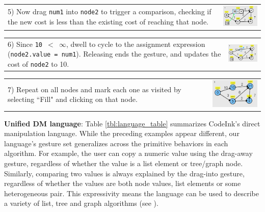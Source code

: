 \noindent \begin{tabular}{m{4.2cm} m{3.8cm}}
5) Now drag \texttt{num1} into \texttt{node2}
to trigger a comparison, checking if the new cost is less than
the existing cost of reaching that node.
& \includegraphics[width=3.8cm]{img/examples/dijkstra-5.png}
\end{tabular}

\noindent \begin{tabular}{m{4.2cm} m{3.8cm}}
6) Since \texttt{10 $<$ $\infty$}, dwell to cycle to the assignment
expression (\texttt{node2.value = num1}). Releasing ends the gesture, and updates the cost
of \texttt{node2} to 10.
& \includegraphics[width=3.8cm]{img/examples/dijkstra-6.png}
\end{tabular}

\noindent \begin{tabular}{m{4.2cm} m{3.8cm}}
7) Repeat on all nodes and mark each one as visited by
selecting ``Fill" and clicking on that node.
& \includegraphics[width=3.8cm]{img/examples/dijkstra-7.png}
\end{tabular}


\noindent \textbf{Unified DM language}:
Table \ref{tbl:language_table} summarizes CodeInk's direct manipulation language.
While the preceding examples appear different, our
language's gesture set generalizes across the primitive behaviors in each
algorithm. For example, the user can copy a numeric value using the drag-away
gesture, regardless of whether the value is a list element or tree/graph node.
Similarly, comparing two values is always explained by the drag-into gesture,
regardless of whether the values are both node values, list elements or some
heterogeneous pair. This expressivity means the language can be used to describe
a variety of list, tree and graph algorithms (see
).

